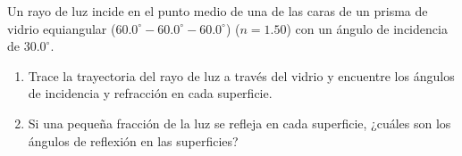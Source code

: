 \item Un rayo de luz incide en el punto medio de una de las caras de un prisma de vidrio equiangular ($60.0^\circ - 60.0^\circ - 60.0^\circ$) ($n = 1.50$) con un ángulo de incidencia de $30.0^\circ$.
\begin{enumerate}
    \item Trace la trayectoria del rayo de luz a través del vidrio y encuentre los ángulos de incidencia y refracción en cada superficie.
    \item Si una pequeña fracción de la luz se refleja en cada superficie, ¿cuáles son los ángulos de reflexión en las superficies?
\end{enumerate}
